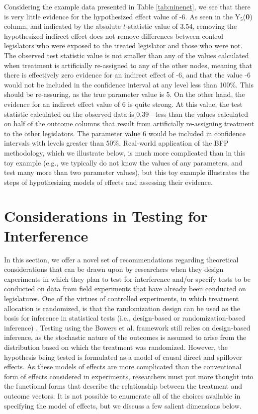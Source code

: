 \documentclass[12pt]{article}
\begin{document}
Considering the example data presented in Table \ref{tab:ninenet}, we see that there is very little evidence for the hypothesized effect value of -6. As seen in the Y$_5$({\bf 0}) column, and indicated by the absolute $t$-statistic value of 3.54, removing the hypothesized indirect effect does not remove differences between control legislators who were exposed to the treated legislator and those who were not. The observed test statistic value is not smaller than any of the values calculated when treatment is artificially re-assigned to any of the other nodes, meaning that there is effectively zero evidence for an indirect effect of -6, and that the value -6 would not be included in the confidence interval at any level less than 100\%. This should be re-assuring, as the true parameter value is 5. On the other hand, the evidence for an indirect effect value of 6 is quite strong. At this value, the test statistic calculated on the observed data is 0.39---less than the values calculated on half of the outcome columns that result from artificially re-assigning treatment to the other legislators. The parameter value 6 would be included in confidence intervals with levels greater than 50\%. Real-world application of the BFP methodology, which we illustrate below, is much more complicated than in this toy example (e.g., we typically do not know the values of any parameters, and test many more than two parameter values), but this toy example illustrates the steps of hypothesizing models of effects and assessing their evidence. 



\section{Considerations in Testing for Interference}

In this section, we offer a novel set of recommendations regarding theoretical considerations that can be drawn upon by researchers when they design experiments in which they plan to test for interference and/or specify tests to be conducted on data from field experiments that have already been conducted on legislatures. One of the virtues of controlled experiments, in which treatment allocation is randomized, is that the randomization design can be used as the basis for inference in statistical tests (i.e., design-based or randomization-based inference) \citep{little2000causal}. Testing using the Bowers et al. framework still relies on design-based inference, as the stochastic nature of the outcomes is assumed to arise from the distribution based on which the treatment was randomized. However, the hypothesis being tested is formulated as a model of causal direct and spillover effects. As these models of effects are more complicated than the conventional form of effects considered in experiments, researchers must put more thought into the functional forms that describe the relationship between the treatment and outcome vectors. It is not possible to enumerate all of the choices available in specifying the model of effects, but we discuss a few salient dimensions below. 
\end{document}

